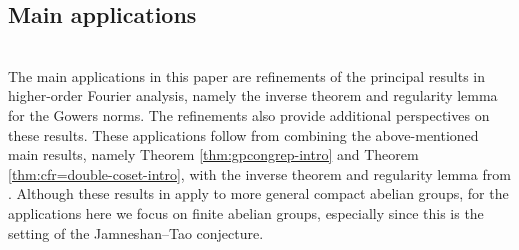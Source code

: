 \documentclass[a4paper,12pt,reqno]{amsart}
\theoremstyle{definition}
\begin{document}
\subsection{Main applications}\label{subsec:intro2step}\hfill\\
The main applications in this paper are refinements of the principal results in higher-order Fourier analysis, namely the inverse theorem and regularity lemma for the Gowers norms. The refinements also provide additional perspectives on these results. These applications follow from combining the above-mentioned main results, namely Theorem \ref{thm:gpcongrep-intro} and Theorem  \ref{thm:cfr=double-coset-intro}, with the inverse theorem and regularity lemma from \cite{CSinverse}. Although these results in \cite{CSinverse} apply to more general compact abelian groups, for the applications here we focus on finite abelian groups, especially since this is the setting of the Jamneshan--Tao conjecture.
\end{document}
